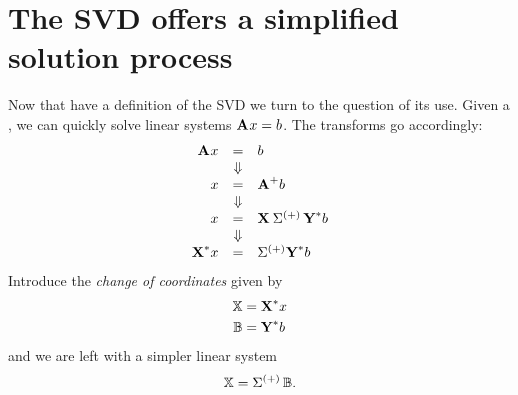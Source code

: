 \section{The SVD offers a simplified solution process}
\label{sec:formal:simple}
Now that have a definition of the SVD we turn to the question of its use. Given a \svdl, we can quickly solve linear systems $\textbf{A}^{\mathrm{}} x = b$. The transforms go accordingly:
\begin{equation}
  \begin{array}{rcl}
  \textbf{A}^{\mathrm{}}x &=& b \\
   &\Downarrow\\
   x &=& \textbf{A}^{\mathrm{+}}b \\
   &\Downarrow\\
   x &=& \textbf{X}^{\mathrm{}} \, \Sigma^{\mathrm{(+)}} \, \textbf{Y}^{\mathrm{ \mathrm{*} }} b\\
   &\Downarrow\\
   \textbf{X}^{\mathrm{*}} x &=& \Sigma^{\mathrm{(+)}}\textbf{Y}^{\mathrm{*}} b
  \end{array}
\end{equation}
Introduce the \textit{change of coordinates} given by
\begin{equation}
  \begin{split}
    \mathbb{X} & = \textbf{X}^{\mathrm{*}} x  \\
    \mathbb{B} & = \textbf{Y}^{\mathrm{*}} b
    \label{eq:moreformal:a}
  \end{split}
\end{equation}
and we are left with a simpler linear system
\begin{equation}
    \mathbb{X} = \Sigma^{\mathrm{(+)}}\, \mathbb{B}.
    \label{eq:formal:svdsoln}
\end{equation}

